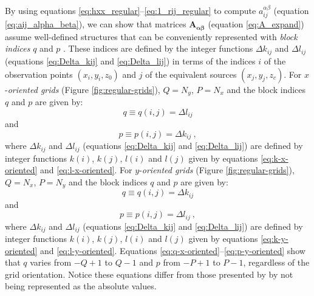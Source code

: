 \documentclass[manuscript]{geophysics}
\begin{document}
By using equations \ref{eq:hxx_regular}--\ref{eq:1_rij_regular} to compute 
$a^{\alpha\beta}_{ij}$ (equation \ref{eq:aij_alpha_beta}), we can show that 
matrices $\mathbf{A_{\boldsymbol{\alpha\beta}}}$ (equation \ref{eq:A_expand}) assume
well-defined structures that can be conveniently
represented with \textit{block indices} $q$ and $p$ \citep{takahashi2020convolutional}.
These indices are defined by the integer functions $\Delta k_{ij}$ and $\Delta l_{ij}$ 
(equations \ref{eq:Delta_kij} and \ref{eq:Delta_lij}) in terms of the indices $i$ 
of the observation points $(x_{i}, y_{i}, z_{0})$ and $j$ of the equivalent sources
$(x_{j}, y_{j}, z_{c})$.
For $x$-\textit{oriented grids} (Figure \ref{fig:regular-grids}), $Q = N_{y}$, $P = N_{x}$ 
and the block indices $q$ and $p$ are given by:
\begin{equation}
	q \equiv q(i, j) = \Delta l_{ij}
	\label{eq:q-x-oriented}
\end{equation}
and
\begin{equation}
	p \equiv p(i, j) = \Delta k_{ij} \: ,
	\label{eq:p-x-oriented}
\end{equation}
where $\Delta k_{ij}$ and $\Delta l_{ij}$ (equations \ref{eq:Delta_kij} and \ref{eq:Delta_lij}) 
are defined by integer functions $k(i)$, $k(j)$, $l(i)$ and $l(j)$ given by equations 
\ref{eq:k-x-oriented} and \ref{eq:l-x-oriented}.
For $y$-\textit{oriented grids} (Figure \ref{fig:regular-grids}), $Q = N_{x}$, $P = N_{y}$ and 
the block indices $q$ and $p$ are given by:
\begin{equation}
	q \equiv q(i, j) = \Delta k_{ij}
	\label{eq:q-y-oriented}
\end{equation}
and
\begin{equation}
	p \equiv p(i, j) = \Delta l_{ij} \: ,
	\label{eq:p-y-oriented}
\end{equation}
where $\Delta k_{ij}$ and $\Delta l_{ij}$ (equations \ref{eq:Delta_kij} and \ref{eq:Delta_lij}) 
are defined by integer functions $k(i)$, $k(j)$, $l(i)$ and $l(j)$ given by equations 
\ref{eq:k-y-oriented} and \ref{eq:l-y-oriented}.
Equations \ref{eq:q-x-oriented}--\ref{eq:p-y-oriented} show that $q$ varies from $-Q+1$
to $Q-1$ and $p$ from $-P+1$ to $P-1$, regardless of the grid orientation. Notice these equations differ 
from those presented by \citet{takahashi2020convolutional} by not being represented as the absolute values.

\end{document}
